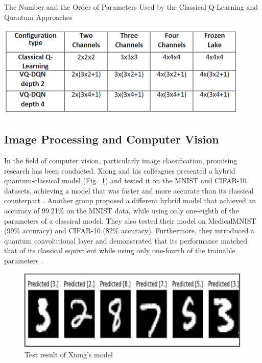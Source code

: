 \documentclass[conference]{IEEEtran}
\begin{document}
\begin{table}[htbp]
	\caption{The Number and the Order of Parameters Used by the Classical Q-Learning and Quantum Approaches \cite{b33}}
	\centerline{\includegraphics[scale=0.85]{qrl.png}}
	\label{table4}
\end{table}

\subsection{Image Processing and Computer Vision}
In the field of computer vision, particularly image classification, promising research has been conducted. Xiong and his colleagues presented a hybrid quantum-classical model (Fig.~\ref{fig9}) and tested it on the MNIST and CIFAR-10 datasets, achieving a model that was faster and more accurate than its classical counterpart \cite{b36}. Another group proposed a different hybrid model that achieved an accuracy of 99.21\% on the MNIST data, while using only one-eighth of the parameters of a classical model. They also tested their model on MedicalMNIST (99\% accuracy) and CIFAR-10 (82\% accuracy). Furthermore, they introduced a quantum convolutional layer and demonstrated that its performance matched that of its classical equivalent while using only one-fourth of the trainable parameters \cite{b37}.
\begin{figure}[htbp]
	\centerline{\includegraphics[scale=0.9]{qcnn.png}}
	\caption{Test result of Xiong’s model \cite{b36}}
	\label{fig9}
\end{figure}
\end{document}
